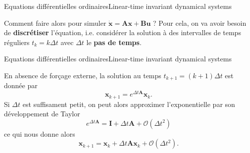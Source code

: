 \documentclass[usenames,dvipsnames,svgnames,10pt,aspectratio=169]{beamer}
\begin{document}
\begin{frame}[t, c]{Equations différentielles ordinaires}{Linear-time invariant dynamical systems}
  \begin{minipage}{.68\textwidth}
    Comment faire alors pour simuler \( \dot{\bm{x}} = \bm{Ax} + \bm{Bu} \) ?
    Pour cela, on va avoir besoin de \alert{\textbf{discrétiser}} l'équation, i.e. considérer la solution à des intervalles de temps réguliers $t_k = k \Delta t$ avec $\Delta t$ le \alert{\textbf{pas de temps}}.
  \end{minipage}%
  \hfill
  \begin{minipage}{.28\textwidth}
    
  \end{minipage}
\end{frame}

\begin{frame}[t, c]{Equations différentielles ordinaires}{Linear-time invariant dynamical systems}
  \begin{minipage}{.68\textwidth}
    En absence de forçage externe, la solution au temps $t_{k+1} = (k+1)\Delta t$ est donnée par
    \[
    \bm{x}_{k+1} = e^{\Delta t \bm{A}} \bm{x}_k.
    \]
    Si $\Delta t$ est suffisament petit, on peut alors approximer l'exponentielle par son développement de Taylor
    \[
    e^{\Delta t \bm{A}} = \bm{I} + \Delta t \bm{A} + \mathcal{O}(\Delta t^2)
    \]
    ce qui nous donne alors
    \[
    \bm{x}_{k+1} = \bm{x}_k + \Delta t \bm{Ax}_k + \mathcal{O}(\Delta t^2).
    \]
  \end{minipage}%
  \hfill
  \begin{minipage}{.28\textwidth}
  \end{minipage}
\end{frame}
\end{document}
